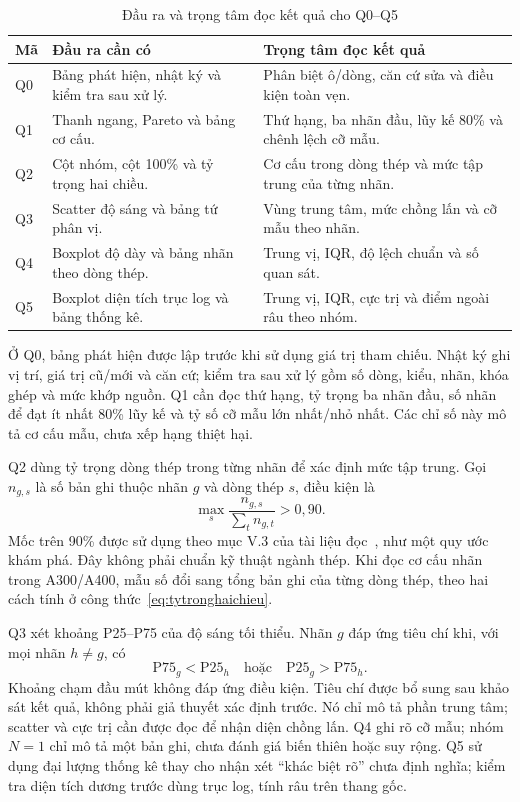 \documentclass[12pt,a4paper,oneside]{report}
\begin{document}
\begin{table}[htbp]
  \centering
  \caption{Đầu ra và trọng tâm đọc kết quả cho Q0--Q5}
  \label{tab:yeucauq0q5}
  \begingroup
  \small
  \begin{tabularx}{\linewidth}{@{}p{0.7cm}Y Y@{}}
    \toprule
    Mã & Đầu ra cần có & Trọng tâm đọc kết quả \\
    \midrule
    Q0 & Bảng phát hiện, nhật ký và kiểm tra sau xử lý. & Phân biệt ô/dòng, căn cứ sửa và điều kiện toàn vẹn. \\
    Q1 & Thanh ngang, Pareto và bảng cơ cấu. & Thứ hạng, ba nhãn đầu, lũy kế 80\% và chênh lệch cỡ mẫu. \\
    Q2 & Cột nhóm, cột 100\% và tỷ trọng hai chiều. & Cơ cấu trong dòng thép và mức tập trung của từng nhãn. \\
    Q3 & Scatter độ sáng và bảng tứ phân vị. & Vùng trung tâm, mức chồng lấn và cỡ mẫu theo nhãn. \\
    Q4 & Boxplot độ dày và bảng nhãn theo dòng thép. & Trung vị, IQR, độ lệch chuẩn và số quan sát. \\
    Q5 & Boxplot diện tích trục log và bảng thống kê. & Trung vị, IQR, cực trị và điểm ngoài râu theo nhóm. \\
    \bottomrule
  \end{tabularx}
  \endgroup
\end{table}

Ở Q0, bảng phát hiện được lập trước khi sử dụng giá trị tham chiếu. Nhật ký ghi vị trí, giá trị cũ/mới và căn cứ; kiểm tra sau xử lý gồm số dòng, kiểu, nhãn, khóa ghép và mức khớp nguồn. Q1 cần đọc thứ hạng, tỷ trọng ba nhãn đầu, số nhãn để đạt ít nhất 80\% lũy kế và tỷ số cỡ mẫu lớn nhất/nhỏ nhất. Các chỉ số này mô tả cơ cấu mẫu, chưa xếp hạng thiệt hại.

Q2 dùng tỷ trọng dòng thép trong từng nhãn để xác định mức tập trung. Gọi $n_{g,s}$ là số bản ghi thuộc nhãn $g$ và dòng thép $s$, điều kiện là
\begin{equation}
  \max_s\frac{n_{g,s}}{\sum_t n_{g,t}}>0{,}90.
  \label{eq:tieuchiq2}
\end{equation}
Mốc trên 90\% được sử dụng theo mục V.3 của tài liệu đọc~\cite{reading}, như một quy ước khám phá. Đây không phải chuẩn kỹ thuật ngành thép. Khi đọc cơ cấu nhãn trong A300/A400, mẫu số đổi sang tổng bản ghi của từng dòng thép, theo hai cách tính ở công thức~\ref{eq:tytronghaichieu}.

Q3 xét khoảng P25--P75 của độ sáng tối thiểu. Nhãn $g$ đáp ứng tiêu chí khi, với mọi nhãn $h\ne g$, có
\begin{equation}
  \mathrm{P75}_g<\mathrm{P25}_h
  \quad\text{hoặc}\quad
  \mathrm{P25}_g>\mathrm{P75}_h.
  \label{eq:tieuchiq3}
\end{equation}
Khoảng chạm đầu mút không đáp ứng điều kiện. Tiêu chí được bổ sung sau khảo sát kết quả, không phải giả thuyết xác định trước. Nó chỉ mô tả phần trung tâm; scatter và cực trị cần được đọc để nhận diện chồng lấn. Q4 ghi rõ cỡ mẫu; nhóm $N=1$ chỉ mô tả một bản ghi, chưa đánh giá biến thiên hoặc suy rộng. Q5 sử dụng đại lượng thống kê thay cho nhận xét ``khác biệt rõ'' chưa định nghĩa; kiểm tra diện tích dương trước dùng trục log, tính râu trên thang gốc.
\end{document}
